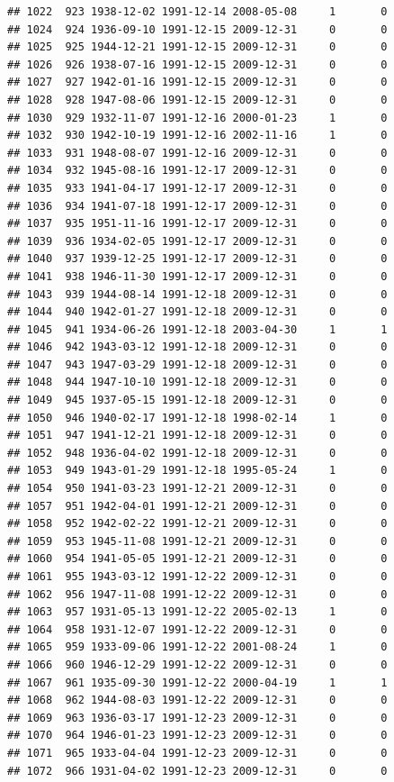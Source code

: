 \documentclass[
]{book}
\theoremstyle{definition}
\theoremstyle{definition}
\theoremstyle{definition}
\theoremstyle{definition}
\theoremstyle{remark}
\begin{document}
\begin{verbatim}
## 1022  923 1938-12-02 1991-12-14 2008-05-08     1       0
## 1024  924 1936-09-10 1991-12-15 2009-12-31     0       0
## 1025  925 1944-12-21 1991-12-15 2009-12-31     0       0
## 1026  926 1938-07-16 1991-12-15 2009-12-31     0       0
## 1027  927 1942-01-16 1991-12-15 2009-12-31     0       0
## 1028  928 1947-08-06 1991-12-15 2009-12-31     0       0
## 1030  929 1932-11-07 1991-12-16 2000-01-23     1       0
## 1032  930 1942-10-19 1991-12-16 2002-11-16     1       0
## 1033  931 1948-08-07 1991-12-16 2009-12-31     0       0
## 1034  932 1945-08-16 1991-12-17 2009-12-31     0       0
## 1035  933 1941-04-17 1991-12-17 2009-12-31     0       0
## 1036  934 1941-07-18 1991-12-17 2009-12-31     0       0
## 1037  935 1951-11-16 1991-12-17 2009-12-31     0       0
## 1039  936 1934-02-05 1991-12-17 2009-12-31     0       0
## 1040  937 1939-12-25 1991-12-17 2009-12-31     0       0
## 1041  938 1946-11-30 1991-12-17 2009-12-31     0       0
## 1043  939 1944-08-14 1991-12-18 2009-12-31     0       0
## 1044  940 1942-01-27 1991-12-18 2009-12-31     0       0
## 1045  941 1934-06-26 1991-12-18 2003-04-30     1       1
## 1046  942 1943-03-12 1991-12-18 2009-12-31     0       0
## 1047  943 1947-03-29 1991-12-18 2009-12-31     0       0
## 1048  944 1947-10-10 1991-12-18 2009-12-31     0       0
## 1049  945 1937-05-15 1991-12-18 2009-12-31     0       0
## 1050  946 1940-02-17 1991-12-18 1998-02-14     1       0
## 1051  947 1941-12-21 1991-12-18 2009-12-31     0       0
## 1052  948 1936-04-02 1991-12-18 2009-12-31     0       0
## 1053  949 1943-01-29 1991-12-18 1995-05-24     1       0
## 1054  950 1941-03-23 1991-12-21 2009-12-31     0       0
## 1057  951 1942-04-01 1991-12-21 2009-12-31     0       0
## 1058  952 1942-02-22 1991-12-21 2009-12-31     0       0
## 1059  953 1945-11-08 1991-12-21 2009-12-31     0       0
## 1060  954 1941-05-05 1991-12-21 2009-12-31     0       0
## 1061  955 1943-03-12 1991-12-22 2009-12-31     0       0
## 1062  956 1947-11-08 1991-12-22 2009-12-31     0       0
## 1063  957 1931-05-13 1991-12-22 2005-02-13     1       0
## 1064  958 1931-12-07 1991-12-22 2009-12-31     0       0
## 1065  959 1933-09-06 1991-12-22 2001-08-24     1       0
## 1066  960 1946-12-29 1991-12-22 2009-12-31     0       0
## 1067  961 1935-09-30 1991-12-22 2000-04-19     1       1
## 1068  962 1944-08-03 1991-12-22 2009-12-31     0       0
## 1069  963 1936-03-17 1991-12-23 2009-12-31     0       0
## 1070  964 1946-01-23 1991-12-23 2009-12-31     0       0
## 1071  965 1933-04-04 1991-12-23 2009-12-31     0       0
## 1072  966 1931-04-02 1991-12-23 2009-12-31     0       0

\end{verbatim}
\end{document}
